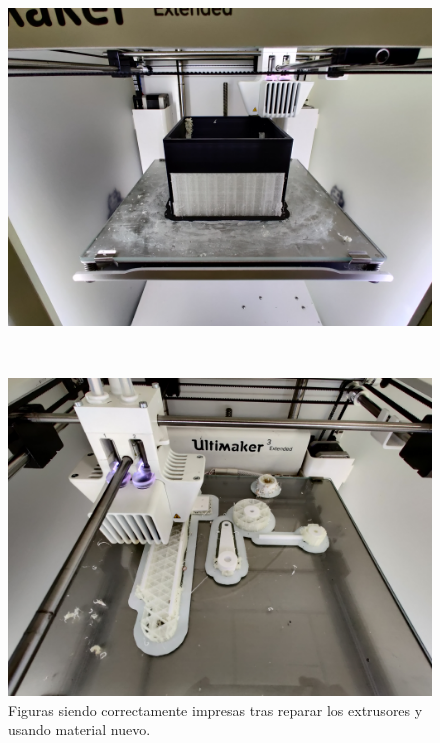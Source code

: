\begin{figure}[H]
    \centering
    \begin{minipage}{.49\linewidth}
        \includegraphics[width=\linewidth]{pictures/box_good.jpg}
    \end{minipage}
    \hfill \\[1ex]
    \begin{minipage}{.49\linewidth}
        \includegraphics[width=\linewidth]{pictures/pieces_good.jpg}
    \end{minipage}
    \caption{Figuras siendo correctamente impresas tras reparar los extrusores y usando material nuevo.}
    \label{fig:good_pieces}
\end{figure}

